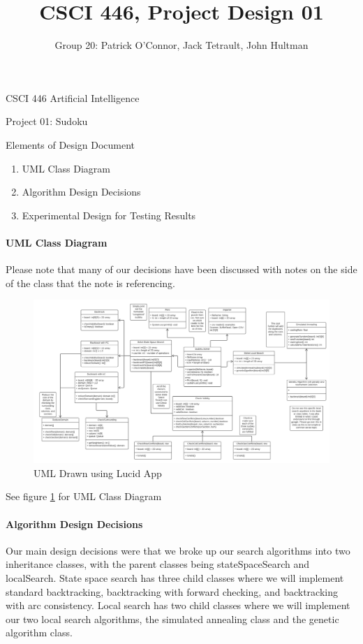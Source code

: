 \documentclass{article}
\title{CSCI 446, Project Design 01}
\author{Group 20: Patrick O'Connor, Jack Tetrault, John Hultman}
\begin{document}
\maketitle

CSCI 446 Artificial Intelligence

Project 01: Sudoku

Elements of Design Document
\begin{enumerate}
    \item UML Class Diagram
    \item Algorithm Design Decisions
    \item Experimental Design for Testing Results
\end{enumerate}
\nextprob{}


\paragraph{UML Class Diagram}

Please note that many of our decisions have been discussed with notes on the side of the class that the note is referencing.

\begin{figure}
    \includegraphics[width=\textwidth]{SudokuUMLDiagram.png}
    \caption{UML Drawn using Lucid App}
    \label{fig:num01}
\end{figure}
See figure \ref{fig:num01} for UML Class Diagram

\nextprob{}

\paragraph{Algorithm Design Decisions}
Our main design decisions were that we broke up our search algorithms into two inheritance classes, 
with the parent classes being stateSpaceSearch and localSearch.  
State space search has three child classes where we will implement standard backtracking, 
backtracking with forward checking, and backtracking with arc consistency.  Local search has 
two child classes where we will implement our two local search algorithms, the simulated annealing class and the genetic algorithm class.
\end{document}

